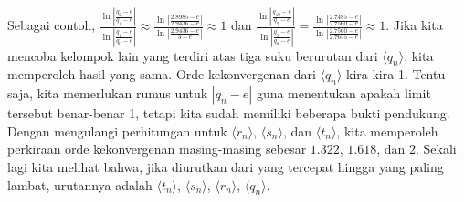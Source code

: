 Sebagai contoh, ${\displaystyle \frac{\ln\left|\frac{q_{2}-e}{q_{1}-e}\right|}{\ln\left|\frac{q_{1}-e}{q_{0}-e}\right|}\approx\frac{\ln\left|\frac{2.8985-e}{2.9436-e}\right|}{\ln\left|\frac{2.9436-e}{3-e}\right|}}\approx1$
dan ${\displaystyle \frac{\ln\left|\frac{q_{10}-e}{q_{9}-e}\right|}{\ln\left|\frac{q_{9}-e}{q_{8}-e}\right|}=\frac{\ln\left|\frac{2.7485-e}{2.7560-e}\right|}{\ln\left|\frac{2.7560-e}{2.7655-e}\right|}}\approx1$.
Jika kita mencoba kelompok lain yang terdiri atas tiga suku berurutan
dari $\langle q_{n}\rangle$, kita memperoleh hasil yang sama. Orde
kekonvergenan dari $\langle q_{n}\rangle$
kira-kira 1. Tentu saja, kita memerlukan rumus untuk $|q_{n}-e|$
guna menentukan apakah limit tersebut benar-benar 1, tetapi kita sudah
memiliki beberapa bukti pendukung. Dengan mengulangi perhitungan untuk
$\langle r_{n}\rangle$, $\langle s_{n}\rangle$, dan $\langle t_{n}\rangle$,
kita memperoleh perkiraan orde kekonvergenan masing-masing sebesar
$1.322$, $1.618$, dan $2$. Sekali lagi kita melihat bahwa, jika
diurutkan dari yang tercepat hingga yang paling lambat, urutannya
adalah $\langle t_{n}\rangle$, $\langle s_{n}\rangle$, $\langle r_{n}\rangle$,
$\langle q_{n}\rangle$. 

